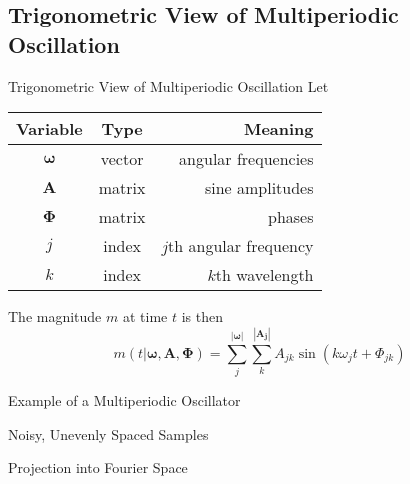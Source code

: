 \documentclass{beamer}
\begin{document}
\subsection{Trigonometric View of Multiperiodic Oscillation}
\begin{frame}{Trigonometric View of Multiperiodic Oscillation}
Let 
\begin{center}
\begin{tabular}{c c r}
\textbf{Variable} & \textbf{Type} & \textbf{Meaning} \\ \hline \hline
$\boldsymbol \omega$ & vector & angular frequencies \\
$\mathbf A$ & matrix & sine amplitudes \\ 
$\boldsymbol \Phi$ & matrix & phases \\
$j$ & index & $j$th angular frequency \\
$k$ & index & $k$th wavelength \\ \hline
\end{tabular}
\end{center}
The magnitude $m$ at time $t$ is then
$$m(t | \boldsymbol \omega, \mathbf A, \boldsymbol \Phi) =
    \sum_j^{|\boldsymbol \omega|} \sum_k^{|\mathbf{A_j}|}
      A_{jk } \sin \left( k \omega_j t + \Phi_{jk} \right) $$
\end{frame}

\begin{frame}{Example of a Multiperiodic Oscillator}
\begin{figure}
\centering

\end{figure} 
\end{frame}

\begin{frame}{Noisy, Unevenly Spaced Samples}
\begin{figure}
\centering

\end{figure} 
\end{frame}

\begin{frame}{Projection into Fourier Space}
\begin{figure}
\centering

\end{figure} 
\end{frame}
\end{document}
